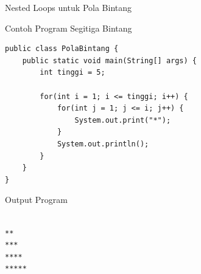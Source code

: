 \documentclass{beamer}
\begin{document}
\begin{frame}[fragile]{Nested Loops untuk Pola Bintang}
  \vspace{-0.2cm}
  \begin{exampleblock}{Contoh Program Segitiga Bintang}
    \begin{lstlisting}[basicstyle=\ttfamily\scriptsize]
public class PolaBintang {
    public static void main(String[] args) {
        int tinggi = 5;
        
        for(int i = 1; i <= tinggi; i++) {
            for(int j = 1; j <= i; j++) {
                System.out.print("*");
            }
            System.out.println();
        }
    }
}
    \end{lstlisting}
  \end{exampleblock}

  \vspace{-0.55cm}
  \begin{block}{Output Program}
    \colorbox{gray!20}{
      \parbox{0.9\textwidth}{
        \texttt{\tiny *\\[-5pt]
        **\\[-5pt]
        ***\\[-5pt]
        ****\\[-5pt]
        *****}
      }
    }
  \end{block}
\end{frame}

\end{document}
